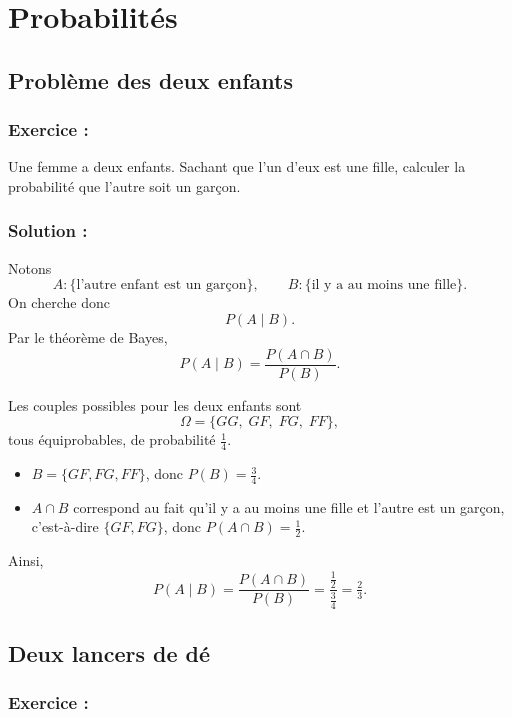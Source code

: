 \chapter{Probabilités}

\section{Problème des deux enfants}

\subsection*{Exercice :}
 
\begin{exerciseBox}
Une femme a deux enfants. Sachant que l'un d'eux est une fille, calculer la probabilité que l'autre soit un garçon.
\end{exerciseBox}

\subsection*{Solution :}

Notons
\[
A : \{\text{l'autre enfant est un garçon}\}, \qquad
B : \{\text{il y a au moins une fille}\}.
\]
On cherche donc
\[
P(A \mid B).
\]
Par le théorème de Bayes,
\[
P(A \mid B) = \frac{P(A \cap B)}{P(B)}.
\]

Les couples possibles pour les deux enfants sont
\[
\Omega = \{GG,\; GF,\; FG,\; FF\},
\]
tous équiprobables, de probabilité $\tfrac14$.

\begin{itemize}
\item $B = \{GF, FG, FF\}$, donc $P(B) = \tfrac34$.
\item $A \cap B$ correspond au fait qu’il y a au moins une fille et l’autre est un garçon,
      c’est-à-dire $\{GF, FG\}$, donc $P(A \cap B) = \tfrac12$.
\end{itemize}

Ainsi,
\[
P(A \mid B)
= \frac{P(A \cap B)}{P(B)}
= \frac{\tfrac12}{\tfrac34}
= \boxed{\tfrac{2}{3}}.
\]



\section{Deux lancers de dé}

\subsection*{Exercice :}

